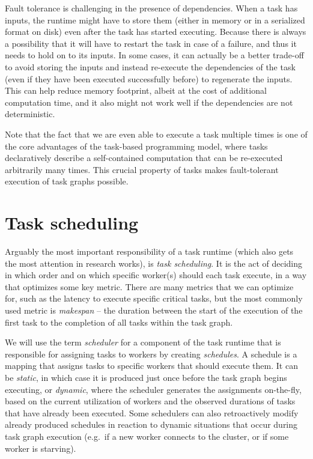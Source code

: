 Fault tolerance is challenging in the presence of dependencies. When a task has inputs, the runtime
might have to store them (either in memory or in a serialized format on disk) even after the task
has started executing. Because there is always a possibility that it will have to restart the task
in case of a failure, and thus it needs to hold on to its inputs. In some cases, it can actually be
a better trade-off to avoid storing the inputs and instead re-execute the dependencies of the task
(even if they have been executed successfully before) to regenerate the inputs. This can help
reduce memory footprint, albeit at the cost of additional computation time, and it also might not
work well if the dependencies are not deterministic.

Note that the fact that we are even able to execute a task multiple times is one of the core
advantages of the task-based programming model, where tasks declaratively describe a self-contained
computation that can be re-executed arbitrarily many times. This crucial property of tasks makes
fault-tolerant execution of task graphs possible.

\section{Task scheduling}
Arguably the most important responsibility of a task runtime (which also gets the most attention in
research works), is \emph{task scheduling}. It is the act of deciding in which order and on which
specific worker(s) should each task execute, in a way that optimizes some key metric. There are
many metrics that we can optimize for, such as the latency to execute specific critical tasks, but
the most commonly used metric is \emph{makespan} -- the duration between the start of the
execution of the first task to the completion of all tasks within the task graph.

We will use the term \emph{scheduler} for a component of the task runtime that is responsible
for assigning tasks to workers by creating \emph{schedules}. A schedule is a mapping that
assigns tasks to specific workers that should execute them. It can be \emph{static}, in
which case it is produced just once before the task graph begins executing, or
\emph{dynamic}, where the scheduler generates the assignments on-the-fly, based on the
current utilization of workers and the observed durations of tasks that have already been executed.
Some schedulers can also retroactively modify already produced schedules in reaction to dynamic
situations that occur during task graph execution (e.g.\ if a new worker connects to the cluster,
or if some worker is starving).

